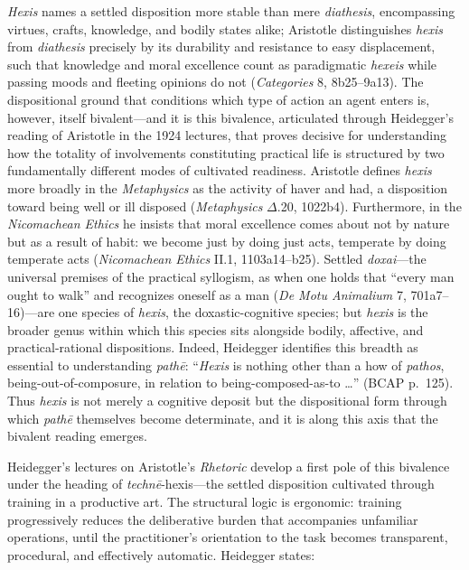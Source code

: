 \documentclass{article}
\begin{document}
\textit{Hexis} names a settled disposition more stable than mere \textit{diathesis}, encompassing virtues, crafts, knowledge, and bodily states alike; Aristotle distinguishes \textit{hexis} from \textit{diathesis} precisely by its durability and resistance to easy displacement, such that knowledge and moral excellence count as paradigmatic \textit{hexeis} while passing moods and fleeting opinions do not (\textit{Categories} 8, 8b25--9a13). The dispositional ground that conditions which type of action an agent enters is, however, itself bivalent---and it is this bivalence, articulated through Heidegger's reading of Aristotle in the 1924 lectures, that proves decisive for understanding how the totality of involvements constituting practical life is structured by two fundamentally different modes of cultivated readiness. Aristotle defines \textit{hexis} more broadly in the \textit{Metaphysics} as the activity of haver and had, a disposition toward being well or ill disposed (\textit{Metaphysics} $\Delta$.20, 1022b4). Furthermore, in the \textit{Nicomachean Ethics} he insists that moral excellence comes about not by nature but as a result of habit: we become just by doing just acts, temperate by doing temperate acts (\textit{Nicomachean Ethics} II.1, 1103a14--b25). Settled \textit{doxai}---the universal premises of the practical syllogism, as when one holds that ``every man ought to walk'' and recognizes oneself as a man (\textit{De Motu Animalium} 7, 701a7--16)---are one species of \textit{hexis}, the doxastic-cognitive species; but \textit{hexis} is the broader genus within which this species sits alongside bodily, affective, and practical-rational dispositions. Indeed, Heidegger identifies this breadth as essential to understanding \textit{pathē}: ``\textit{Hexis} is nothing other than a how of \textit{pathos}, being-out-of-composure, in relation to being-composed-as-to \ldots'' (BCAP p.~125). Thus \textit{hexis} is not merely a cognitive deposit but the dispositional form through which \textit{pathē} themselves become determinate, and it is along this axis that the bivalent reading emerges.

Heidegger's lectures on Aristotle's \textit{Rhetoric} develop a first pole of this bivalence under the heading of \textit{techn\=e}-hexis---the settled disposition cultivated through training in a productive art. The structural logic is ergonomic: training progressively reduces the deliberative burden that accompanies unfamiliar operations, until the practitioner's orientation to the task becomes transparent, procedural, and effectively automatic. Heidegger states:
\end{document}

